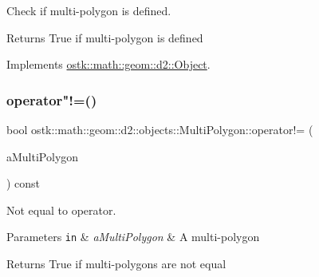 Check if multi-\/polygon is defined. 

\begin{DoxyReturn}{Returns}
True if multi-\/polygon is defined 
\end{DoxyReturn}


Implements \hyperlink{classostk_1_1math_1_1geom_1_1d2_1_1_object_a456cc7121218d24c1322d0fe54230cc4}{ostk\+::math\+::geom\+::d2\+::\+Object}.

\mbox{\label{classostk_1_1math_1_1geom_1_1d2_1_1objects_1_1_multi_polygon_aa2c66641f9b699bdc4795d93078b8d8a}} 
\subsubsection{\texorpdfstring{operator"!=()}{operator!=()}}
{\footnotesize\ttfamily bool ostk\+::math\+::geom\+::d2\+::objects\+::\+Multi\+Polygon\+::operator!= (\begin{DoxyParamCaption}\item[{const \hyperlink{classostk_1_1math_1_1geom_1_1d2_1_1objects_1_1_multi_polygon}{Multi\+Polygon} \&}]{a\+Multi\+Polygon }\end{DoxyParamCaption}) const}



Not equal to operator. 


\begin{DoxyParams}[1]{Parameters}
\mbox{\tt in}  & {\em a\+Multi\+Polygon} & A multi-\/polygon \\
\hline
\end{DoxyParams}
\begin{DoxyReturn}{Returns}
True if multi-\/polygons are not equal 
\end{DoxyReturn}
\mbox{\label{classostk_1_1math_1_1geom_1_1d2_1_1objects_1_1_multi_polygon_a7864532e16a3db3ced54c09f40218af9}} 

